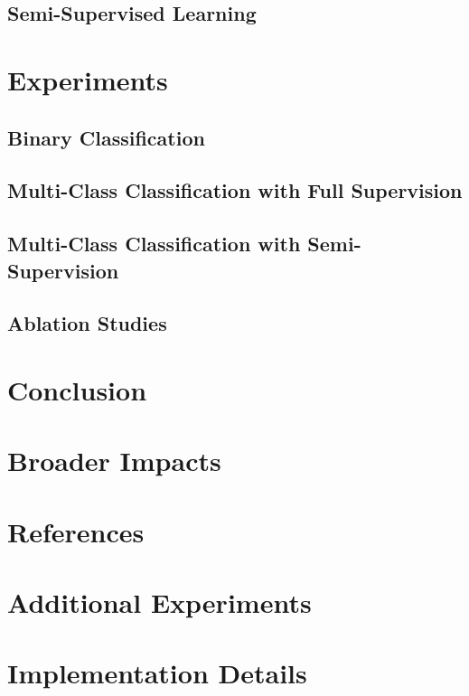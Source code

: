\documentclass{article}
\begin{document}
\subsection{Semi-Supervised Learning}


\section{Experiments}


\subsection{Binary Classification}


\subsection{Multi-Class Classification with Full Supervision}


\subsection{Multi-Class Classification with Semi-Supervision}


\subsection{Ablation Studies}


\section{Conclusion}


\section{Broader Impacts}


\section*{References}


\appendix
\section{Additional Experiments}


\section{Implementation Details}
\end{document}
